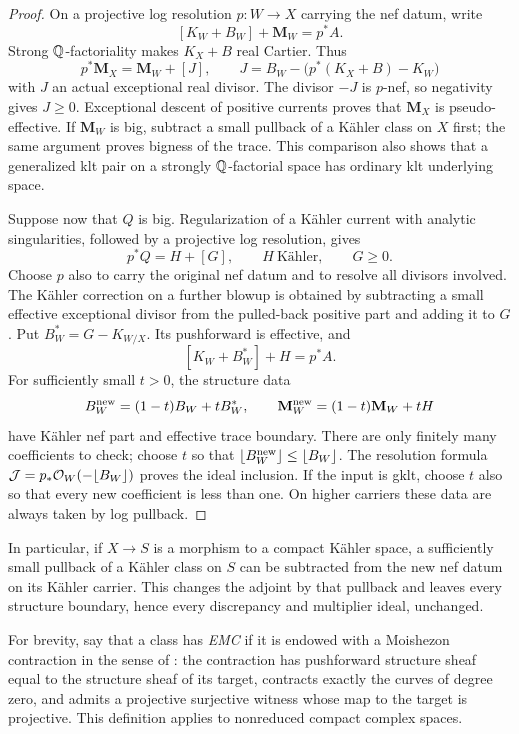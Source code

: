 \begin{proof}
On a projective log resolution $p:W\to X$ carrying the nef datum,
write
\[
 [K_W+B_W]+\mathbf M_W=p^*A.
\]
Strong $\mathbb Q$-factoriality makes $K_X+B$ real Cartier. Thus
\[
 p^*\mathbf M_X=\mathbf M_W+[J],\qquad
 J=B_W-\bigl(p^*(K_X+B)-K_W\bigr)
\]
with $J$ an actual exceptional real divisor. The divisor $-J$ is
$p$-nef, so negativity gives $J\geq0$. Exceptional descent of
positive currents proves that $\mathbf M_X$ is pseudo-effective.
If $\mathbf M_W$ is big, subtract a small pullback of a K\"ahler
class on $X$ first; the same argument proves bigness of the trace.
This comparison also shows that a generalized klt pair on a
strongly $\mathbb Q$-factorial space has ordinary klt underlying space.

Suppose now that $Q$ is big. Regularization of a K\"ahler current
with analytic singularities, followed by a projective log resolution,
gives
\[
                         p^*Q=H+[G],
 \qquad H\ \text{K\"ahler},\qquad G\geq0.
\]
Choose $p$ also to carry the original nef datum and to resolve all
divisors involved. The K\"ahler correction on a further blowup is
obtained by subtracting a small effective exceptional divisor from
the pulled-back positive part and adding it to $G$.
Put $B_W^*=G-K_{W/X}$. Its pushforward is effective, and
\[
                         [K_W+B_W^*]+H=p^*A.
\]
For sufficiently small $t>0$, the structure data
\[
 B_W^{\rm new}=(1-t)B_W+tB_W^*,\qquad
 \mathbf M_W^{\rm new}=(1-t)\mathbf M_W+tH
\]
have K\"ahler nef part and effective trace boundary. There are only
finitely many coefficients to check; choose $t$ so that
$\lfloor B_W^{\rm new}\rfloor\leq\lfloor B_W\rfloor$.
The resolution formula
$\mathcal J=p_*\mathcal O_W(-\lfloor B_W\rfloor)$ proves the ideal
inclusion. If the input is gklt, choose $t$ also so that every new
coefficient is less than one. On higher carriers these data are
always taken by log pullback.
\end{proof}

In particular, if $X\to S$ is a morphism to a compact K\"ahler
space, a sufficiently small pullback of a K\"ahler class on $S$
can be subtracted from the new nef datum on its K\"ahler carrier.
This changes the adjoint by that pullback and leaves every structure
boundary, hence every discrepancy and multiplier ideal, unchanged.

For brevity, say that a class has \emph{EMC} if it is endowed with
a Moishezon contraction in the sense of
\cite[Definitions~2.32 and~2.34]{HX2026}: the contraction has
pushforward structure sheaf equal to the structure sheaf of its
target, contracts exactly the curves of degree zero, and admits a
projective surjective witness whose map to the target is projective.
This definition applies to nonreduced compact complex spaces.

